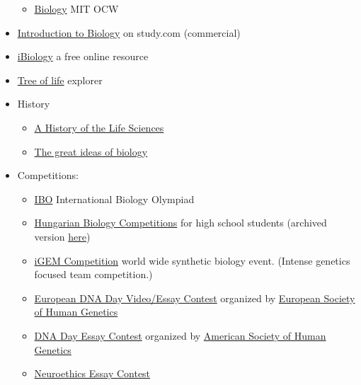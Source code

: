 \documentclass{article}
\begin{document}
\begin{itemize}
\begin{itemize}
    \item \href{https://ocw.mit.edu/courses/biology/}{Biology} MIT OCW
    \end{itemize}
    
    \item \href{https://study.com/academy/course/introduction-to-biology.html}{Introduction to Biology} on study.com (commercial)
    
    \item \href{https://www.ibiology.org/}{iBiology} a free online resource 
    
    \item \href{https://www.onezoom.org/}{Tree of life} explorer
    
    \item History
    \begin{itemize}
    \item \href{https://www.goodreads.com/book/show/40951.A_History_of_the_Life_Sciences}{A History of the Life Sciences}
    \item \href{https://www.youtube.com/watch?v=llPMfaz4qnA}{The great ideas of biology}
    \end{itemize}
    \item Competitions:
    \begin{itemize}
        \item \href{https://www.ibo-info.org/en/}{IBO} International Biology Olympiad
        \item \href{http://biologia.fazekas.hu/kozepiskolai-versenyek/}{Hungarian Biology Competitions} for high school students (archived version \href{https://web.archive.org/web/20230331011226/http://biologia.fazekas.hu/kozepiskolai-versenyek/}{here})
        \item \href{https://competition.igem.org/}{iGEM Competition} world wide synthetic biology event. (Intense genetics focused team competition.)
        \item \href{https://www.dnaday.eu}{European DNA Day Video/Essay Contest} organized by \href{https://www.eshg.org/}{European Society of Human Genetics}
        \item \href{https://www.ashg.org/dna-day/}{DNA Day Essay Contest} organized by \href{https://www.ashg.org/}{American Society of Human Genetics}
        \item \href{https://neuroethicsessaycontest.com/call/}{Neuroethics Essay Contest} 
    \end{itemize}
    

\end{itemize}
\end{document}
